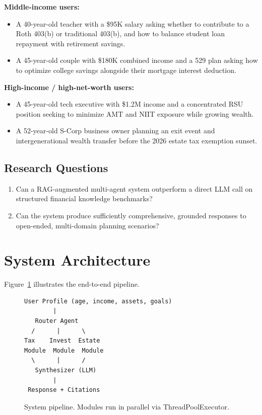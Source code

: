 \documentclass[sigplan,screen]{acmart}
\begin{document}
\textbf{Middle-income users:}
\begin{itemize}
  \item A 40-year-old teacher with a \$95K salary asking whether to contribute to a Roth 403(b) or traditional 403(b), and how to balance student loan repayment with retirement savings.
  \item A 45-year-old couple with \$180K combined income and a 529 plan asking how to optimize college savings alongside their mortgage interest deduction.
\end{itemize}

\textbf{High-income / high-net-worth users:}
\begin{itemize}
  \item A 45-year-old tech executive with \$1.2M income and a concentrated RSU position seeking to minimize AMT and NIIT exposure while growing wealth.
  \item A 52-year-old S-Corp business owner planning an exit event and intergenerational wealth transfer before the 2026 estate tax exemption sunset.
\end{itemize}

\subsection{Research Questions}

\begin{enumerate}
  \item Can a RAG-augmented multi-agent system outperform a direct LLM call on structured financial knowledge benchmarks?
  \item Can the system produce sufficiently comprehensive, grounded responses to open-ended, multi-domain planning scenarios?
\end{enumerate}

\section{System Architecture}

Figure~\ref{fig:arch} illustrates the end-to-end pipeline.

\begin{figure}[h]
\centering
\begin{verbatim}
User Profile (age, income, assets, goals)
        |
   Router Agent
  /      |      \
Tax    Invest  Estate
Module  Module  Module
  \      |      /
   Synthesizer (LLM)
        |
 Response + Citations
\end{verbatim}
\caption{System pipeline. Modules run in parallel via ThreadPoolExecutor.}
\label{fig:arch}
\end{figure}
\end{document}
